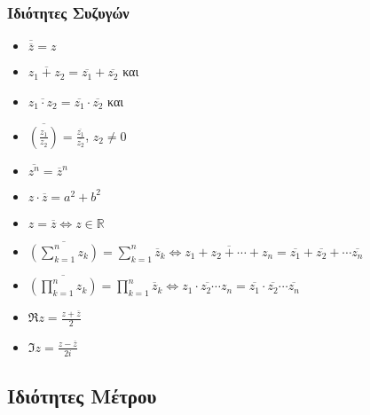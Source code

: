 \subsubsection*{Ιδιότητες Συζυγών}


\begin{itemize}
  \item $\overline{\overline{z}}=z$
  \item $\overline{z_{1}+z_{2}}=\overline{z_{1}}+\overline{z_{2}}$ και
  \item $\overline{z_{1}\cdot z_{2}}=\overline{z_{1}}\cdot\overline{z_{2}}$ και
  \item $\overline{\left(\frac{z_{1}}{z_{2}}\right)}=\frac{\overline{z_{1}}}{\overline{z_{2}}}$, $z_{2}\neq 0$
  \item $\overline{z^{n}}=\overline{z}^n$
  \item $z\cdot \overline{z}=a^{2}+b^{2}$
  \item $z=\overline{z}\Leftrightarrow z\in\mathbb{R}$
  \item $\overline{\left(\sum_{k=1}^{n}z_{k}\right)}=\sum_{k=1}^{n}\overline{z}_{k}\Leftrightarrow \overline{z_{1}+z_{2}+\cdots +z_{n}}=\overline{z_{1}}+\overline{z_{2}}+\cdots \overline{z_{n}}$
  \item $\overline{\left(\prod_{k=1}^{n}z_{k}\right)}=\prod_{k=1}^{n}\overline{z}_{k}\Leftrightarrow \overline{z_{1}\cdot z_{2}\cdots z_{n}}=\overline{z_{1}}\cdot \overline{z_{2}}\cdots \overline{z_{n}}$
\end{itemize}

  \begin{itemize}


    \item $\Re z=\frac{z+\overline{z}}{2}$
    \item $\Im z=\frac{z-\overline{z}}{2i}$


  \end{itemize}



  \subsection*{Ιδιότητες Μέτρου}


